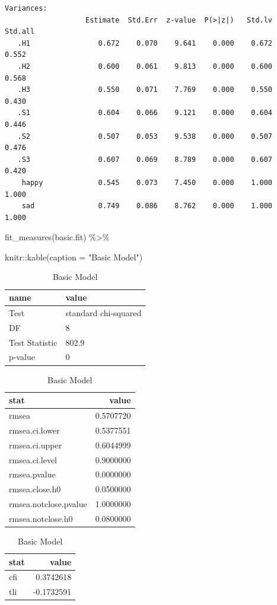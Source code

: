 \documentclass[
  letterpaper,
  DIV=11,
  numbers=noendperiod]{scrreprt}
\newenvironment{Shaded}{\begin{snugshade}}{\end{snugshade}}
\newcommand{\AttributeTok}[1]{\textcolor[rgb]{0.40,0.45,0.13}{#1}}
\newcommand{\FunctionTok}[1]{\textcolor[rgb]{0.28,0.35,0.67}{#1}}
\newcommand{\NormalTok}[1]{\textcolor[rgb]{0.00,0.23,0.31}{#1}}
\newcommand{\SpecialCharTok}[1]{\textcolor[rgb]{0.37,0.37,0.37}{#1}}
\newcommand{\StringTok}[1]{\textcolor[rgb]{0.13,0.47,0.30}{#1}}
\begin{document}
\begin{verbatim}
Variances:
                   Estimate  Std.Err  z-value  P(>|z|)   Std.lv  Std.all
   .H1                0.672    0.070    9.641    0.000    0.672    0.552
   .H2                0.600    0.061    9.813    0.000    0.600    0.568
   .H3                0.550    0.071    7.769    0.000    0.550    0.430
   .S1                0.604    0.066    9.121    0.000    0.604    0.446
   .S2                0.507    0.053    9.538    0.000    0.507    0.476
   .S3                0.607    0.069    8.789    0.000    0.607    0.420
    happy             0.545    0.073    7.450    0.000    1.000    1.000
    sad               0.749    0.086    8.762    0.000    1.000    1.000
\end{verbatim}

\begin{Shaded}
\begin{Highlighting}[]
\FunctionTok{fit\_measures}\NormalTok{(basic.fit) }\SpecialCharTok{\%\textgreater{}\%} 
  
\NormalTok{  knitr}\SpecialCharTok{::}\FunctionTok{kable}\NormalTok{(}\AttributeTok{caption =} \StringTok{"Basic Model"}\NormalTok{)}
\end{Highlighting}
\end{Shaded}

\begin{table}
\caption{Basic Model}

\centering
\begin{tabular}[t]{l|l}
\hline
name & value\\
\hline
Test & standard chi-squared\\
\hline
DF & 8\\
\hline
Test Statistic & 802.9\\
\hline
p-value & 0\\
\hline
\end{tabular}
\centering
\begin{tabular}[t]{l|r}
\hline
stat & value\\
\hline
rmsea & 0.5707720\\
\hline
rmsea.ci.lower & 0.5377551\\
\hline
rmsea.ci.upper & 0.6044999\\
\hline
rmsea.ci.level & 0.9000000\\
\hline
rmsea.pvalue & 0.0000000\\
\hline
rmsea.close.h0 & 0.0500000\\
\hline
rmsea.notclose.pvalue & 1.0000000\\
\hline
rmsea.notclose.h0 & 0.0800000\\
\hline
\end{tabular}
\centering
\begin{tabular}[t]{l|r}
\hline
stat & value\\
\hline
cfi & 0.3742618\\
\hline
tli & -0.1732591\\
\hline
\end{tabular}
\end{table}
\end{document}

